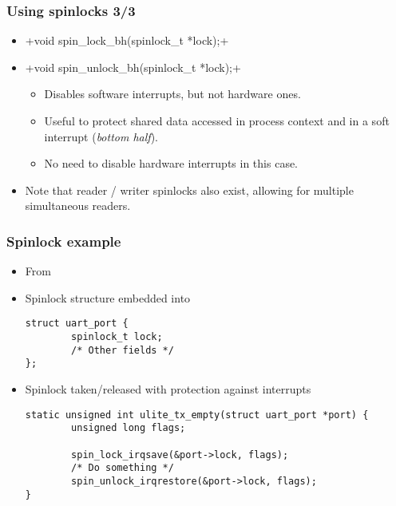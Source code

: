 \begin{frame}[fragile]
  \frametitle{Using spinlocks 3/3}
  \begin{itemize}
  \item {}+void spin_lock_bh(spinlock_t *lock);+
  \item {}+void spin_unlock_bh(spinlock_t *lock);+
    \begin{itemize}
    \item Disables software interrupts, but not hardware ones.
    \item Useful to protect shared data accessed in process context
      and in a soft interrupt (\emph{bottom half}).
    \item No need to disable hardware interrupts in this case.
    \end{itemize}
  \item Note that reader / writer spinlocks also exist, allowing
	for multiple simultaneous readers.
  \end{itemize}
\end{frame}

\begin{frame}[fragile]
  \frametitle{Spinlock example}
  \begin{itemize}
  \item From 
  \item Spinlock structure embedded into 
    \begin{block}{}
    \begin{verbatim}
struct uart_port {
        spinlock_t lock;
        /* Other fields */
};
    \end{verbatim}
    \end{block}
  \item Spinlock taken/released with protection against interrupts
    \begin{block}{}
    \begin{verbatim}
static unsigned int ulite_tx_empty(struct uart_port *port) {
        unsigned long flags;

        spin_lock_irqsave(&port->lock, flags);
        /* Do something */
        spin_unlock_irqrestore(&port->lock, flags);
}
    \end{verbatim}
    \end{block}
  \end{itemize}
\end{frame}

